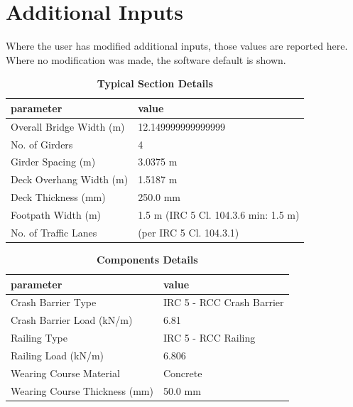 \documentclass[12pt,a4paper]{report}
\numberwithin{table}{chapter}
\numberwithin{figure}{chapter}
\begin{document}
\newpage
\section{Additional Inputs}
\label{sec:additional-inputs}

Where the user has modified additional inputs, those values are reported here. Where no modification was made, the software default is shown.

\vspace{0.8cm}

\begin{longtable}{|L{5.5cm}|p{10.0cm}|}
\caption{\textbf{Typical Section Details}}
\hline
\textbf{parameter} & \textbf{value} \\
\hline
\textnormal{Overall Bridge Width (m)} & 12.149999999999999 \\[6pt]
\hline
\textnormal{No. of Girders} & 4 \\[6pt]
\hline
\textnormal{Girder Spacing (m)} & 3.0375 m \\[6pt]
\hline
\textnormal{Deck Overhang Width (m)} & 1.5187 m \\[6pt]
\hline
\textnormal{Deck Thickness (mm)} & 250.0 mm \\[6pt]
\hline
\textnormal{Footpath Width (m)} & 1.5 m (IRC 5 Cl. 104.3.6 min: 1.5 m) \\[6pt]
\hline
\textnormal{No. of Traffic Lanes} &  (per IRC 5 Cl. 104.3.1) \\[6pt]
\hline
\end{longtable}

\vspace{0.8em}

\begin{longtable}{|L{5.5cm}|p{10.0cm}|}
\caption{\textbf{Components Details}}
\hline
\textbf{parameter} & \textbf{value} \\
\hline
\textnormal{Crash Barrier Type} & IRC 5 - RCC Crash Barrier \\[6pt]
\hline
\textnormal{Crash Barrier Load (kN/m)} & 6.81 \\[6pt]
\hline

\textnormal{Railing Type} & IRC 5 - RCC Railing \\[6pt]
\hline
\textnormal{Railing Load (kN/m)} & 6.806 \\[6pt]
\hline
\textnormal{Wearing Course Material} & Concrete \\[6pt]
\hline
\textnormal{Wearing Course Thickness (mm)} & 50.0 mm \\[6pt]
\hline
\end{longtable}
\end{document}
